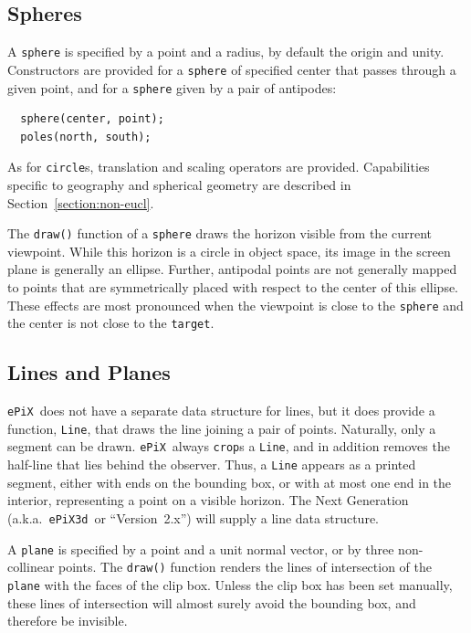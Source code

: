 \documentclass[12pt]{report}
\newcommand{\code}[1]{\texttt{#1}}
\newcommand{\ePiX}{\code{ePiX}}
\begin{document}
\subsection*{Spheres}

A \code{sphere} is specified by a point and a radius, by default the
origin and unity. Constructors are provided for a \code{sphere} of
specified center that passes through a given point, and for a
\code{sphere} given by a pair of antipodes:
\begin{verbatim}
  sphere(center, point);
  poles(north, south);
\end{verbatim}
As for \code{circle}s, translation and scaling operators are provided.
Capabilities specific to geography and spherical geometry are
described in Section~\ref{section:non-eucl}.

The \code{draw()} function of a \code{sphere} draws the horizon
visible from the current viewpoint. While this horizon is a circle in
object space, its image in the screen plane is generally an ellipse.
Further, antipodal points are not generally mapped to points that are
symmetrically placed with respect to the center of this ellipse. These
effects are most pronounced when the viewpoint is close to the
\code{sphere} and the center is not close to the \code{target}.

  
\subsection*{Lines and Planes}

\ePiX\ does not have a separate data structure for lines, but it does
provide a function, \code{Line}, that draws the line joining a pair of
points. Naturally, only a segment can be drawn. \ePiX\ always
\code{crop}s a \code{Line}, and in addition removes the half-line that
lies behind the observer. Thus, a \code{Line} appears as a printed
segment, either with ends on the bounding box, or with at most one end
in the interior, representing a point on a visible horizon. The Next
Generation (a.k.a.\ \code{ePiX3d}~or ``Version~2.x'') will supply a
line data structure.

A \code{plane} is specified by a point and a unit normal vector, or by
three non-collinear points. The \code{draw()} function renders the
lines of intersection of the \code{plane} with the faces of the
clip box. Unless the clip box has been set manually, these lines of
intersection will almost surely avoid the bounding box, and therefore
be invisible.
\end{document}
